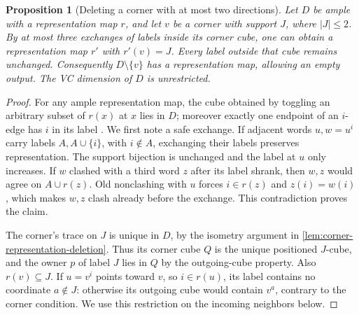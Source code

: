 \documentclass[11pt]{article}
\newtheorem{proposition}{Proposition}[section]
\theoremstyle{definition}
\begin{document}
\begin{proposition}[Deleting a corner with at most two directions]
\label{prop:small-corner-map-repair}
Let $D$ be ample with a representation map $r$, and let $v$ be a corner
with support $J$, where $|J|\le2$. By at most three exchanges of labels
inside its corner cube, one can obtain a representation map $r'$ with
$r'(v)=J$. Every label outside that cube remains unchanged. Consequently
$D\setminus\{v\}$ has a representation map, allowing an empty output.
The VC dimension of $D$ is unrestricted.
\end{proposition}
\begin{proof}
For any ample representation map, the cube obtained by toggling an arbitrary
subset of $r(x)$ at $x$ lies in $D$; moreover exactly one endpoint of an
$i$-edge has $i$ in its label \cite[Corollary~6.7 and Theorem~6.8]{CCMW}.
We first note a safe exchange. If adjacent words $u,w=u^i$ carry labels
$A,A\cup\{i\}$, with $i\notin A$, exchanging their labels preserves
representation. The support bijection is unchanged and the label at $u$
only increases. If $w$ clashed with a third word $z$ after its label shrank,
then $w,z$ would agree on $A\cup r(z)$. Old nonclashing with $u$ forces
$i\in r(z)$ and $z(i)=w(i)$, which makes $w,z$ clash already before the
exchange. This contradiction proves the claim.

The corner's trace on $J$ is unique in $D$, by the isometry argument in
\cref{lem:corner-representation-deletion}. Thus its corner cube $Q$ is the
unique positioned $J$-cube, and the owner $p$ of label $J$ lies in $Q$ by
the outgoing-cube property. Also $r(v)\subseteq J$. If $u=v^i$ points
toward $v$, so $i\in r(u)$, its label contains no coordinate $a\notin J$:
otherwise its outgoing cube would contain $v^a$, contrary to the corner
condition. We use this restriction on the incoming neighbors below.


\end{proof}
\end{document}
